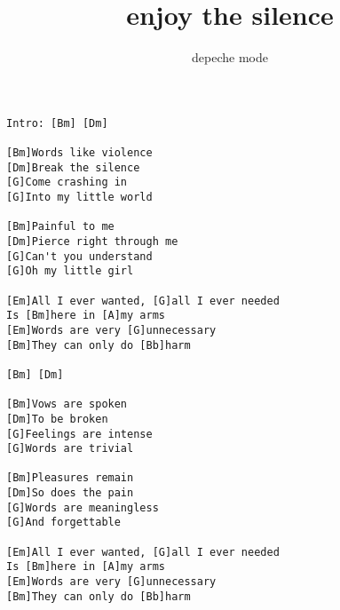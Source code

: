 \author{depeche mode}
\title{enjoy the silence}
\maketitle
\begin{verbatim}
Intro: [Bm] [Dm]

[Bm]Words like violence
[Dm]Break the silence
[G]Come crashing in
[G]Into my little world

[Bm]Painful to me
[Dm]Pierce right through me
[G]Can't you understand
[G]Oh my little girl

[Em]All I ever wanted, [G]all I ever needed
Is [Bm]here in [A]my arms
[Em]Words are very [G]unnecessary
[Bm]They can only do [Bb]harm

[Bm] [Dm]

[Bm]Vows are spoken
[Dm]To be broken
[G]Feelings are intense
[G]Words are trivial

[Bm]Pleasures remain
[Dm]So does the pain
[G]Words are meaningless
[G]And forgettable

[Em]All I ever wanted, [G]all I ever needed
Is [Bm]here in [A]my arms
[Em]Words are very [G]unnecessary
[Bm]They can only do [Bb]harm
\end{verbatim}